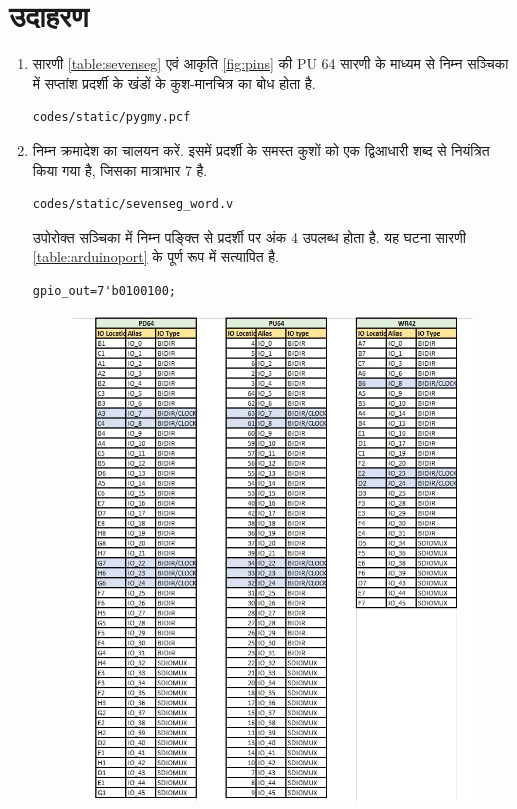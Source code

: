 \documentclass[journal,12pt,twocolumn]{IEEEtran}
\renewcommand\thesection{\arabic{section}}
\begin{document}
\section{उदाहरण}
\renewcommand{\theequation}{\theenumi}
\renewcommand{\thefigure}{\theenumi}
\begin{enumerate}[label=\thesection.\arabic*.,ref=\thesection.\theenumi]



\item  सारणी \ref{table:sevenseg} एवं 
आकृति \ref{fig:pins}  की PU 64 सारणी के माध्यम से निम्न सञ्चिका में सप्तांश प्रदर्शी के खंडों के कुश-मानचित्र का बोध होता है.  
\begin{lstlisting}
codes/static/pygmy.pcf
\end{lstlisting}
\item निम्न क्रमादेश का चालयन करें.  इसमें प्रदर्शी के समस्त कुशों को एक द्विआधारी शब्द से नियंत्रित किया गया है, जिसका मात्राभार 7 है.
\begin{lstlisting}
codes/static/sevenseg_word.v
\end{lstlisting}
उपोरोक्त सञ्चिका में निम्न पङ्क्ति से प्रदर्शी पर अंक 4 उपलब्ध होता है.  यह घटना सारणी \ref{table:arduinoport}  के पूर्ण रूप में सत्यापित है. 
\begin{lstlisting}
gpio_out=7'b0100100;
\end{lstlisting}
\begin{figure}[!ht]
\centering
\includegraphics[width = \textwidth]{figs/pins.jpg}

\end{figure}
\end{enumerate}
\end{document}
